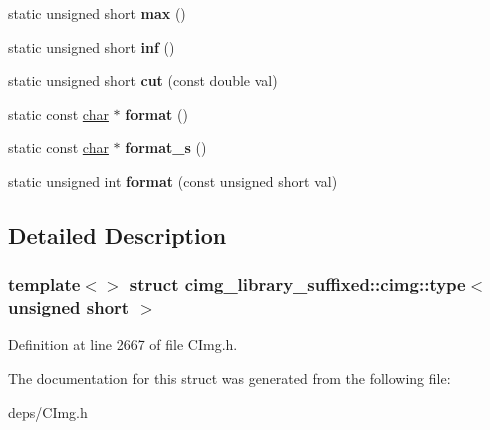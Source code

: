 \begin{DoxyCompactItemize}
\mbox{\label{structcimg__library__suffixed_1_1cimg_1_1type_3_01unsigned_01short_01_4_a2972b9e58a4e5802aca25c67075f9099}} 
static unsigned short {\bfseries max} ()
\item 
\mbox{\label{structcimg__library__suffixed_1_1cimg_1_1type_3_01unsigned_01short_01_4_a85421f6823f6b27172e3018c851f8fc4}} 
static unsigned short {\bfseries inf} ()
\item 
\mbox{\label{structcimg__library__suffixed_1_1cimg_1_1type_3_01unsigned_01short_01_4_a8169a54f647ae5c58d6944affd19124f}} 
static unsigned short {\bfseries cut} (const double val)
\item 
\mbox{\label{structcimg__library__suffixed_1_1cimg_1_1type_3_01unsigned_01short_01_4_aa09d2ec1252041e3a597acfdc3f75941}} 
static const \hyperlink{classchar}{char} $\ast$ {\bfseries format} ()
\item 
\mbox{\label{structcimg__library__suffixed_1_1cimg_1_1type_3_01unsigned_01short_01_4_a618ca66174a58f7fb8adca7cf5fee4f8}} 
static const \hyperlink{classchar}{char} $\ast$ {\bfseries format\+\_\+s} ()
\item 
\mbox{\label{structcimg__library__suffixed_1_1cimg_1_1type_3_01unsigned_01short_01_4_abc51e1c688bde19b443288ea12be4b32}} 
static unsigned int {\bfseries format} (const unsigned short val)
\end{DoxyCompactItemize}


\subsection{Detailed Description}
\subsubsection*{template$<$$>$\newline
struct cimg\+\_\+library\+\_\+suffixed\+::cimg\+::type$<$ unsigned short $>$}



Definition at line 2667 of file C\+Img.\+h.



The documentation for this struct was generated from the following file\+:\begin{DoxyCompactItemize}
\item 
deps/C\+Img.\+h\end{DoxyCompactItemize}
